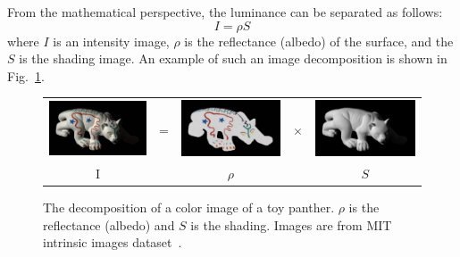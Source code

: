 From the mathematical perspective, the luminance can be separated as follows:
\begin{equation}\label{eq:sfs_equation}
    I = \rho S
\end{equation}
where $I$ is an intensity image, $\rho$ is the reflectance (albedo) of the surface, and the $S$ is the shading image. 
An example of such an image decomposition is shown in Fig.~\ref{fig:shading}.
\begin{figure}[!htbp]
\centering
\setlength{\tabcolsep}{0.1em} %
 {\renewcommand{\arraystretch}{0.6}%
\begin{tabular}{c c c c c}
   \includegraphics[height = 0.16\linewidth]{figures/panther_rgb.pdf} \hspace{0.05cm}   &
   \multirow{-10}{*}{\parbox[t]{3.5mm}{=}}  & 
   \includegraphics[height = 0.16\linewidth]{figures/panther_rho.pdf} &
    \multirow{-10}{*}{\parbox[t]{3.5mm}{$\times$}}  & 
   \includegraphics[height = 0.16\linewidth]{figures/panther_shade.pdf} \\
      {I} &{} &{$\rho$} & {}& {$S$}            
 \end{tabular}}
\caption{The decomposition of a color image of a toy panther. $\rho$ is the reflectance (albedo) and $S$ is the shading. Images are from MIT intrinsic images dataset~\cite{grosse2009ground}.}
\label{fig:shading}
\end{figure}

